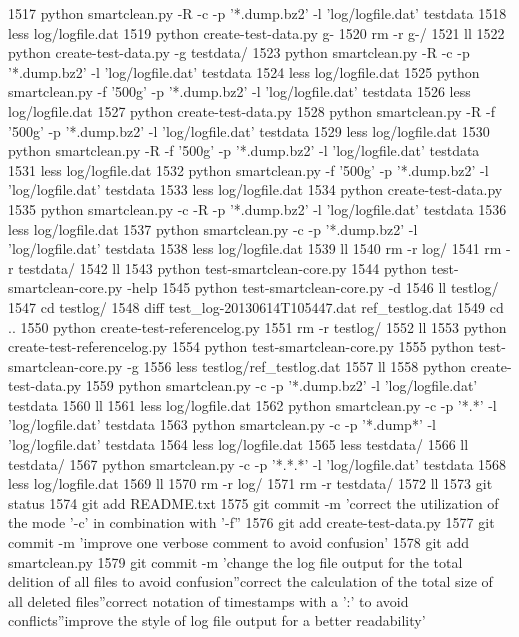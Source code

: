  1517  python smartclean.py -R -c -p '*.dump.bz2' -l 'log/logfile.dat' testdata
 1518  less log/logfile.dat 
 1519  python create-test-data.py g-
 1520  rm -r g-/
 1521  ll
 1522  python create-test-data.py -g testdata/
 1523  python smartclean.py -R -c -p '*.dump.bz2' -l 'log/logfile.dat' testdata
 1524  less log/logfile.dat 
 1525  python smartclean.py -f '500g' -p '*.dump.bz2' -l 'log/logfile.dat' testdata
 1526  less log/logfile.dat 
 1527  python create-test-data.py
 1528  python smartclean.py -R -f '500g' -p '*.dump.bz2' -l 'log/logfile.dat' testdata
 1529  less log/logfile.dat 
 1530  python smartclean.py -R -f '500g' -p '*.dump.bz2' -l 'log/logfile.dat' testdata
 1531  less log/logfile.dat 
 1532  python smartclean.py -f '500g' -p '*.dump.bz2' -l 'log/logfile.dat' testdata
 1533  less log/logfile.dat 
 1534  python create-test-data.py
 1535  python smartclean.py -c -R -p '*.dump.bz2' -l 'log/logfile.dat' testdata
 1536  less log/logfile.dat 
 1537  python smartclean.py -c -p '*.dump.bz2' -l 'log/logfile.dat' testdata
 1538  less log/logfile.dat 
 1539  ll
 1540  rm -r log/
 1541  rm -r testdata/
 1542  ll
 1543  python test-smartclean-core.py 
 1544  python test-smartclean-core.py -help
 1545  python test-smartclean-core.py -d
 1546  ll testlog/
 1547  cd testlog/
 1548  diff test_log-20130614T105447.dat ref_testlog.dat 
 1549  cd ..
 1550  python create-test-referencelog.py 
 1551  rm -r testlog/
 1552  ll
 1553  python create-test-referencelog.py 
 1554  python test-smartclean-core.py
 1555  python test-smartclean-core.py -g
 1556  less testlog/ref_testlog.dat 
 1557  ll
 1558  python create-test-data.py 
 1559  python smartclean.py -c -p '*.dump.bz2' -l 'log/logfile.dat' testdata
 1560  ll
 1561  less log/logfile.dat 
 1562  python smartclean.py -c -p '*.*' -l 'log/logfile.dat' testdata
 1563  python smartclean.py -c -p '*.dump*' -l 'log/logfile.dat' testdata
 1564  less log/logfile.dat 
 1565  less testdata/
 1566  ll testdata/
 1567  python smartclean.py -c -p '*.*.*' -l 'log/logfile.dat' testdata
 1568  less log/logfile.dat 
 1569  ll
 1570  rm -r log/
 1571  rm -r testdata/
 1572  ll
 1573  git status
 1574  git add README.txt
 1575  git commit -m 'correct the utilization of the mode '-c' in combination with '-f''
 1576  git add create-test-data.py
 1577  git commit -m 'improve one verbose comment to avoid confusion'
 1578  git add smartclean.py
 1579  git commit -m 'change the log file output for the total delition of all files to avoid confusion''correct the calculation of the total size of all deleted files''correct notation of timestamps with a ':' to avoid conflicts''improve the style of log file output for a better readability'
